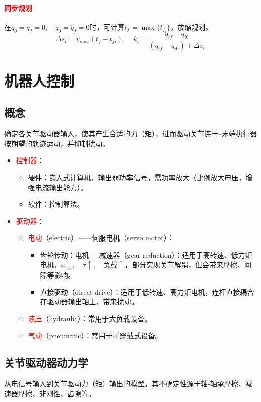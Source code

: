 \documentclass[
12pt, %
a4paper, 
oneside, %
]{scrartcl}
\begin{document}
\paragraph{\textcolor{red}{同步规划}}
在$ \dot{q}_0 = \dot{q}_f = 0, \quad \ddot{q}_0 = \ddot{q}_f = 0 $时，可计算$ t_f = \max\{t_{f_i}\} $，放缩规划。
$$ \Delta s_i = v_{max}(t_f - t_{fi}), \quad k_i = \frac{q_{if} - q_{i0}}{(q_{if} - q_{i0}) + \Delta s_i} $$
\section{机器人控制}
\subsection[概念]{概念}
确定各关节驱动器输入，使其产生合适的力（矩），进而驱动关节连杆--末端执行器按期望的轨迹运动，并抑制扰动。
\begin{itemize}
\item \textcolor{red}{控制器}：
\begin{itemize}
\item 硬件：嵌入式计算机，输出弱功率信号，需功率放大（比例放大电压，增强电流输出能力）。
\item 软件：控制算法。
\end{itemize}
\item \textcolor{red}{驱动器}：
\begin{itemize}
\item \textcolor{red}{电动}（electric）——伺服电机（servo motor）：
\begin{itemize}
\item 齿轮传动：电机 + 减速器（gear reduction）：适用于高转速、低力矩电机，$ \omega \downarrow, \quad \tau \uparrow, \quad \text{负载} \uparrow $，部分实现关节解耦，但会带来摩擦、间隙等影响。
\item 直接驱动（direct-drive）：适用于低转速、高力矩电机，连杆直接耦合在驱动器输出轴上，带来扰动。
\end{itemize}
\item \textcolor{red}{液压}（hydraulic）：常用于大负载设备。
\item \textcolor{red}{气动}（pneumatic）：常用于可穿戴式设备。
\end{itemize}
\end{itemize}
\subsection[关节驱动器动力学]{关节驱动器动力学}
从电信号输入到关节驱动力（矩）输出的模型，其不确定性源于轴-轴承摩擦、减速器摩擦、非刚性、齿隙等。
\end{document}
